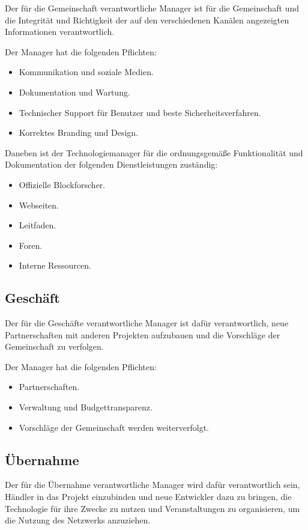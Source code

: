 \documentclass{article}
\begin{document}
Der für die Gemeinschaft verantwortliche Manager ist für die Gemeinschaft und die Integrität und Richtigkeit der auf den verschiedenen Kanälen angezeigten Informationen verantwortlich.

Der Manager hat die folgenden Pflichten:

\begin{itemize}
  \item Kommunikation und soziale Medien.
  \item Dokumentation und Wartung.
  \item Technischer Support für Benutzer und beste Sicherheitsverfahren.
  \item Korrektes Branding und Design.
\end{itemize}

Daneben ist der Technologiemanager für die ordnungsgemäße Funktionalität und Dokumentation der folgenden Dienstleistungen zuständig:

\begin{itemize}
  \item Offizielle Blockforscher.
  \item Webseiten.
  \item Leitfaden.
  \item Foren.
  \item Interne Ressourcen.
\end{itemize}


\subsection{Geschäft}

Der für die Geschäfte verantwortliche Manager ist dafür verantwortlich, neue Partnerschaften mit anderen Projekten aufzubauen und die Vorschläge der Gemeinschaft zu verfolgen.

Der Manager hat die folgenden Pflichten:

\begin{itemize}
  \item Partnerschaften.
  \item Verwaltung und Budgettransparenz.
  \item Vorschläge der Gemeinschaft werden weiterverfolgt.
\end{itemize}

\subsection{Übernahme}

Der für die Übernahme verantwortliche Manager wird dafür verantwortlich sein, Händler in das Projekt einzubinden und neue Entwickler dazu zu bringen, die Technologie für ihre Zwecke zu nutzen und Veranstaltungen zu organisieren, um die Nutzung des Netzwerks anzuziehen.
\end{document}
